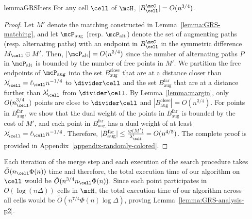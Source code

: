 \begin{restatable}{lemma}{GRSIters}\label{lemma:GRS-cell-process}
    For any cell $\cell$ of $\mcH$, $|B_\cell^\mcC|=O(n^{3/4})$.
\end{restatable}
\begin{proof}
    Let $M'$ denote the matching constructed in Lemma~\ref{lemma:GRS-matching}, and let $\mcP_{\mathrm{aug}}$ (resp. $\mcP_{\mathrm{alt}}$) denote the set of augmenting paths (resp. alternating paths) with an endpoint in $B_\cell^\mcC$ in the symmetric difference $M_\cell\oplus M'$. Then, $|\mcP_{\mathrm{alt}}|=O(n^{3/4})$ since the number of alternating paths $P$ in $\mcP_{\mathrm{alt}}$ is bounded by the number of free points in $M'$. 
    We partition the free endpoints of $\mcP_{\mathrm{aug}}$ into the set $B^{\mathrm{close}}_{\mathrm{aug}}$ that are at a distance closer than $\lambda'_\cell=\ell_\cell n^{-1/4}$ to $\divider\cell$ and the set $B^{\mathrm{far}}_{\mathrm{aug}}$ that are at a distance further than $\lambda'_\cell$ from $\divider\cell$. By Lemma~\ref{lemma:margin}, only $O(n_\cell^{3/4})$ points are close to $\divider\cell$ and $|B^{\mathrm{close}}_{\mathrm{aug}}|=O(n^{3/4})$. 
    For points in $B^{\mathrm{far}}_{\mathrm{aug}}$, we show that the dual weight of the points in $B^{\mathrm{far}}_{\mathrm{aug}}$ is bounded by the cost of $M'$, and each point in $B^{\mathrm{far}}_{\mathrm{aug}}$ has a dual weight of at least $\lambda'_\cell = \ell_\cell n^{-1/4}$. Therefore, $|B^{\mathrm{far}}_{\mathrm{aug}}|\le \frac{w(M')}{\lambda'_\cell}= O(n^{4/5})$. The complete proof is provided in Appendix~\ref{appendix-randomly-colored}.
\end{proof}



Each iteration of the merge step and each execution of the search procedure takes $\tilde{O}(n_\cell\Phi(n))$ time and therefore, the total execution time of our algorithm on $\cell$ would be $\tilde{O}(n^{3/4}n_\cell\Phi(n))$. Since each point participates in $O(\log(n\Delta))$ cells in $\mcH$, the total execution time of our algorithm across all cells would be $\tilde{O}(n^{7/4}\Phi(n)\log\Delta)$, proving Lemma~\ref{lemma:GRS-analysis-p2}.



%
%
%


%















